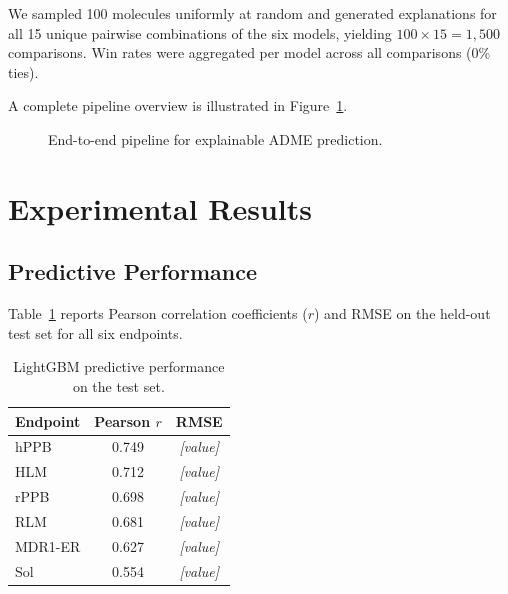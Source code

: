 \documentclass[a4paper, 11pt]{article}
\begin{document}
We sampled 100 molecules uniformly at random and generated explanations for
all 15 unique pairwise combinations of the six models, yielding
$100 \times 15 = 1{,}500$ comparisons. Win rates were aggregated per model
across all comparisons (0\% ties).

\medskip
A complete pipeline overview is illustrated in Figure~\ref{fig:pipeline}.

\begin{figure}[H]
  \centering
  \caption{End-to-end pipeline for explainable ADME prediction.}
  \label{fig:pipeline}
\end{figure}


\section{Experimental Results}
\label{sec:results}

\subsection{Predictive Performance}

Table~\ref{tab:pearson} reports Pearson correlation coefficients ($r$) and
RMSE on the held-out test set for all six endpoints.

\begin{table}[H]
  \centering
  \caption{LightGBM predictive performance on the test set.}
  \label{tab:pearson}
  \begin{tabular}{lcc}
    \toprule
    \textbf{Endpoint} & \textbf{Pearson $r$} & \textbf{RMSE} \\
    \midrule
    hPPB    & 0.749 & \textit{[value]} \\
    HLM     & 0.712 & \textit{[value]} \\
    rPPB    & 0.698 & \textit{[value]} \\
    RLM     & 0.681 & \textit{[value]} \\
    MDR1-ER & 0.627 & \textit{[value]} \\
    Sol     & 0.554 & \textit{[value]} \\
    \bottomrule
  \end{tabular}
\end{table}
\end{document}
